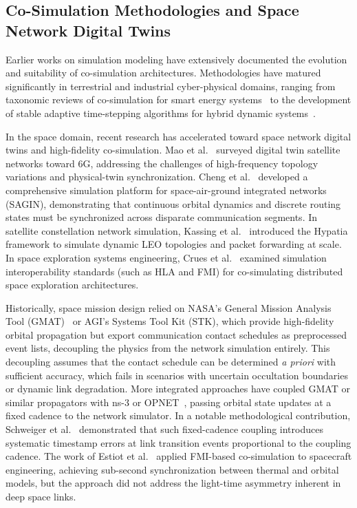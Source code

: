 \documentclass[a4paper,fleqn]{cas-sc}
\begin{document}
\subsection{Co-Simulation Methodologies and Space Network Digital Twins}
Earlier works on simulation modeling have extensively documented the evolution and suitability of co-simulation architectures. Methodologies have matured significantly in terrestrial and industrial cyber-physical domains, ranging from taxonomic reviews of co-simulation for smart energy systems~\cite{simpat_taxonomic} to the development of stable adaptive time-stepping algorithms for hybrid dynamic systems~\cite{simpat_adaptive, simpat_multirate}. 

In the space domain, recent research has accelerated toward space network digital twins and high-fidelity co-simulation. Mao et al.~\cite{mao_satellite_dt_2024} surveyed digital twin satellite networks toward 6G, addressing the challenges of high-frequency topology variations and physical-twin synchronization. Cheng et al.~\cite{cheng_sagin_sim_2020} developed a comprehensive simulation platform for space-air-ground integrated networks (SAGIN), demonstrating that continuous orbital dynamics and discrete routing states must be synchronized across disparate communication segments. In satellite constellation network simulation, Kassing et al.~\cite{kassing_hypatia_2020} introduced the Hypatia framework to simulate dynamic LEO topologies and packet forwarding at scale. In space exploration systems engineering, Crues et al.~\cite{crues_space_cosim_2022} examined simulation interoperability standards (such as HLA and FMI) for co-simulating distributed space exploration architectures.

Historically, space mission design relied on NASA's General Mission Analysis Tool (GMAT)~\cite{gmat} or AGI's Systems Tool Kit (STK), which provide high-fidelity orbital propagation but export communication contact schedules as preprocessed event lists, decoupling the physics from the network simulation entirely. This decoupling assumes that the contact schedule can be determined \emph{a priori} with sufficient accuracy, which fails in scenarios with uncertain occultation boundaries or dynamic link degradation. More integrated approaches have coupled GMAT or similar propagators with ns-3 or OPNET~\cite{opnet_gmat_coupling}, passing orbital state updates at a fixed cadence to the network simulator. In a notable methodological contribution, Schweiger et al.~\cite{simpat_multirate} demonstrated that such fixed-cadence coupling introduces systematic timestamp errors at link transition events proportional to the coupling cadence. The work of Estiot et al.~\cite{estiot} applied FMI-based co-simulation to spacecraft engineering, achieving sub-second synchronization between thermal and orbital models, but the approach did not address the light-time asymmetry inherent in deep space links.
\end{document}
